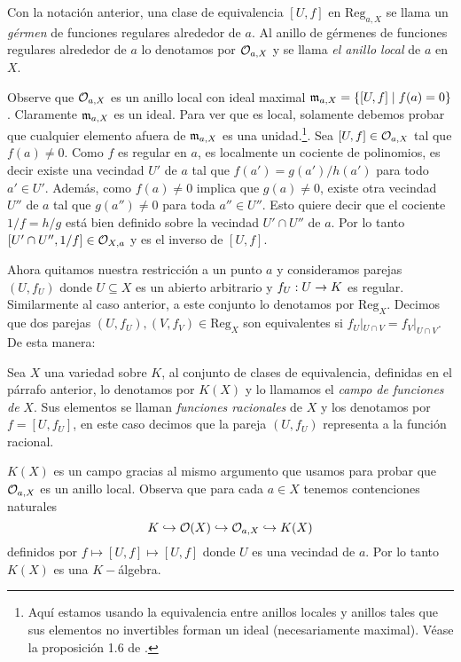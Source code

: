 \begin{defin}
Con la notación anterior, una clase de equivalencia $[U,f]$ en $\mathrm{Reg}_{a,X}$ se llama un \emph{gérmen} de funciones regulares alrededor de $a$. Al anillo de gérmenes de funciones regulares alrededor de $a$ lo denotamos por $\mathcal{O}_{a,X}$ y se llama \emph{el anillo local} de $a$ en $X$.
\end{defin}

\begin{nota}
Observe que $\mathcal{O}_{a,X}$ es un anillo local con ideal maximal $\mathfrak{m}_{a,X}=\{[U,f]\mid f(a)= 0\}$. Claramente $\mathfrak{m}_{a,X}$ es un ideal. Para ver que es local, solamente debemos probar que cualquier elemento afuera de $\mathfrak{m}_{a,X}$ es una unidad.\footnote{Aquí estamos usando la equivalencia entre anillos locales y anillos tales que sus elementos no invertibles forman un ideal (necesariamente maximal). Véase la proposición 1.6 de \cite{AtiyahITCA}.}. Sea $[U,f]\in\mathcal{O}_{a,X}$ tal que $f(a)\neq0$. Como $f$ es regular en $a$, es localmente un cociente de polinomios, es decir existe una vecindad $U'$ de $a$ tal que $f(a')=g(a')/h(a')$ para todo $a'\in U'$. Además, como $f(a)\neq 0$ implica que $g(a)\neq 0$, existe otra vecindad $U''$ de $a$ tal que $g(a'')\neq 0$ para toda $a''\in U''$. Esto quiere decir que el cociente $1/f=h/g$ está bien definido sobre la vecindad $U'\cap U''$ de $a$. Por lo tanto $[U'\cap U'',1/f]\in\mathcal{O}_{X,a}$ y es el inverso de $[U,f]$. 
\end{nota}

Ahora quitamos nuestra restricción a un punto $a$ y consideramos parejas $(U,f_U)$ donde $U\subseteq X$ es un abierto arbitrario y $f_U:U\rightarrow K$ es regular. Similarmente al caso anterior, a este conjunto lo denotamos por $\mathrm{Reg}_X$. Decimos que dos parejas $(U,f_U),(V,f_V)\in\mathrm{Reg}_X$ son equivalentes si $f_U|_{U\cap V}=f_V|_{U\cap V}$. De esta manera:

\begin{defin}
Sea $X$ una variedad sobre $K$, al conjunto de clases de equivalencia, definidas en el párrafo anterior, lo denotamos por $K(X)$ y lo llamamos el \emph{campo de funciones de} $X$. Sus elementos se llaman \emph{funciones racionales} de $X$ y los denotamos por $f=[U,f_U]$, en este caso decimos que la pareja $(U,f_U)$ representa a la función racional.
\end{defin}

\begin{nota}
$K(X)$ es un campo gracias al mismo argumento que usamos para probar que $\mathcal{O}_{a,X}$ es un anillo local. Observa que para cada $a\in X$ tenemos contenciones naturales
\[
	K\hookrightarrow\mathcal{O}(X)\hookrightarrow\mathcal{O}_{a,X}\hookrightarrow K(X)
\]
definidos por $f\mapsto[U,f]\mapsto[U,f]$ donde $U$ es una vecindad de $a$. Por lo tanto $K(X)$ es una $K-$álgebra. 
\end{nota}

